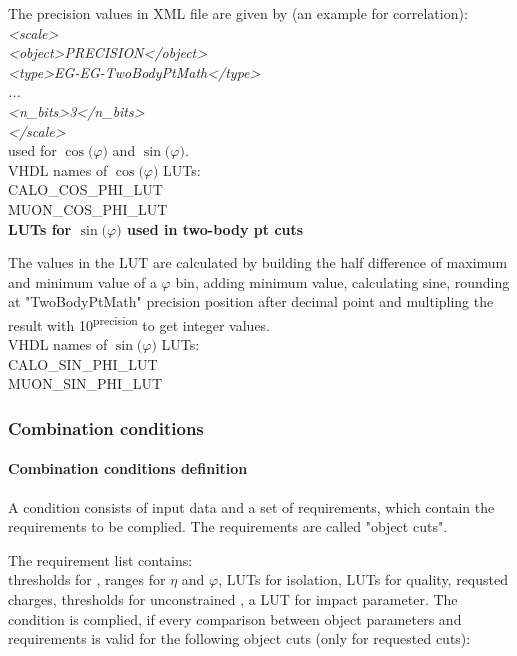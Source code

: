 The precision values in XML file are given by (an example for \eg \eg correlation):\\
\textit{<scale>\\
    <object>PRECISION</object>\\
    <type>EG-EG-TwoBodyPtMath</type>\\
    ...\\
    <n\_bits>3</n\_bits>\\
</scale>}\\
used for $\cos($$\varphi$$)$ and $\sin($$\varphi$$)$.\\

VHDL names of $\cos($$\varphi$$)$ LUTs:\\
CALO\_COS\_PHI\_LUT\\
MUON\_COS\_PHI\_LUT\\

\textbf{LUTs for $\sin($$\varphi$$)$ used in two-body pt cuts}
\label{sec:gtl:calc_luts_sin_phi}

The values in the LUT are calculated by building the half difference of maximum and minimum value of a $\varphi$ bin, adding minimum value, calculating sine, rounding at "TwoBodyPtMath" precision position after decimal point and multipling the result with 10\textsuperscript{\tiny{precision}} to get integer values.\\

VHDL names of $\sin($$\varphi$$)$ LUTs:\\
CALO\_SIN\_PHI\_LUT\\
MUON\_SIN\_PHI\_LUT\\

\clearpage

\subsubsection{Combination conditions}
\label{sec:gtl:combination_conditions}

\paragraph{Combination conditions definition}
\label{sec:gtl:comb_cond_def}

A condition consists of input data and a set of requirements, which contain the requirements to be complied. The requirements are called "object cuts".

The requirement list contains:\\
thresholds for \pt, ranges for $\eta$ and $\varphi$, LUTs for isolation, LUTs for quality, requsted charges, thresholds for unconstrained \pt, a LUT for impact parameter.
The condition is complied, if every comparison between object parameters and requirements is valid for the following object cuts (only for requested cuts):

